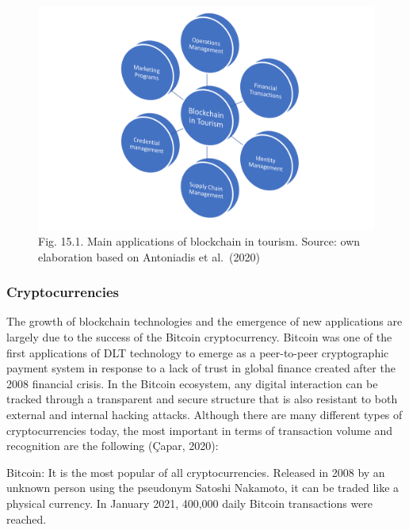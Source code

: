 \documentclass[
  letterpaper,
  DIV=11,
  numbers=noendperiod]{scrreprt}
\begin{document}
\begin{figure}

{\centering \includegraphics{img/fig24.png}

}

\caption{Fig. 15.1. Main applications of blockchain in tourism. Source:
own elaboration based on Antoniadis et al.~(2020)}

\end{figure}

\hypertarget{cryptocurrencies}{%
\subsubsection{Cryptocurrencies}\label{cryptocurrencies}}

The growth of blockchain technologies and the emergence of new
applications are largely due to the success of the Bitcoin
cryptocurrency. Bitcoin was one of the first applications of DLT
technology to emerge as a peer-to-peer cryptographic payment system in
response to a lack of trust in global finance created after the 2008
financial crisis. In the Bitcoin ecosystem, any digital interaction can
be tracked through a transparent and secure structure that is also
resistant to both external and internal hacking attacks. Although there
are many different types of cryptocurrencies today, the most important
in terms of transaction volume and recognition are the following (Çapar,
2020):

Bitcoin: It is the most popular of all cryptocurrencies. Released in
2008 by an unknown person using the pseudonym Satoshi Nakamoto, it can
be traded like a physical currency. In January 2021, 400,000 daily
Bitcoin transactions were reached.
\end{document}
